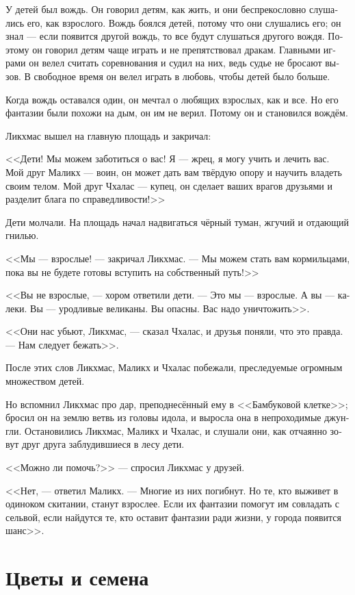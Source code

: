 \documentclass[a4paper,12pt,fleqn]{book}\usepackage{cooltooltips}\usepackage{polyglossia}\setdefaultlanguage[babelshorthands=true]{russian}\setotherlanguage{english}\defaultfontfeatures{Ligatures=TeX,Mapping=tex-text} \usepackage{xcolor}\definecolor{lightgray}{HTML}{bbbbbb}\color{lightgray}\newcommand{\ml}[3]{\textenglish{\textcolor{black}{#3}}}
\newcommand{\textspace}{\vspace{1em}{\centering\Large\bfseries<...>\par}\vspace{1em}}
\begin{document}
{У детей был вождь.
Он говорил детям, как жить, и они беспрекословно слушались его, как взрослого.
Вождь боялся детей, потому что они слушались его;
он знал --- если появится другой вождь, то все будут слушаться другого вождя.
Поэтому он говорил детям чаще играть и не препятствовал дракам.
Главными играми он велел считать соревнования и судил на них, ведь судье не бросают вызов.
В свободное время он велел играть в любовь, чтобы детей было больше.

Когда вождь оставался один, он мечтал о любящих взрослых, как и все.
Но его фантазии были похожи на дым, он им не верил.
Потому он и становился вождём.

\textspace

Ликхмас вышел на главную площадь и закричал:

<<Дети!
Мы можем заботиться о вас!
Я --- жрец, я могу учить и лечить вас.
Мой друг Маликх --- воин, он может дать вам твёрдую опору и научить владеть своим телом.
Мой друг Чхалас --- купец, он сделает ваших врагов друзьями и разделит блага по справедливости!>>

Дети молчали.
На площадь начал надвигаться чёрный туман, жгучий и отдающий гнилью.

<<Мы --- взрослые! --- закричал Ликхмас.
--- Мы можем стать вам кормильцами, пока вы не будете готовы вступить на собственный путь!>>

<<Вы не взрослые, --- хором ответили дети.
--- Это мы --- взрослые.
А вы --- калеки.
Вы --- уродливые великаны.
Вы опасны.
Вас надо уничтожить>>.

<<Они нас убьют, Ликхмас, --- сказал Чхалас, и друзья поняли, что это правда.
--- Нам следует бежать>>.

После этих слов Ликхмас, Маликх и Чхалас побежали, преследуемые огромным множеством детей.

Но вспомнил Ликхмас про дар, преподнесённый ему в <<Бамбуковой клетке>>;
бросил он на землю ветвь из головы идола, и выросла она в непроходимые джунгли.
Остановились Ликхмас, Маликх и Чхалас, и слушали они, как отчаянно зовут друг друга заблудившиеся в лесу дети.

<<Можно ли помочь?>> --- спросил Ликхмас у друзей.

<<Нет, --- ответил Маликх.
--- Многие из них погибнут.
Но те, кто выживет в одиноком скитании, станут взрослее.
Если их фантазии помогут им совладать с сельвой, если найдутся те, кто оставит фантазии ради жизни, у города появится шанс>>.

\section{Цветы и семена}

}
\end{document}
